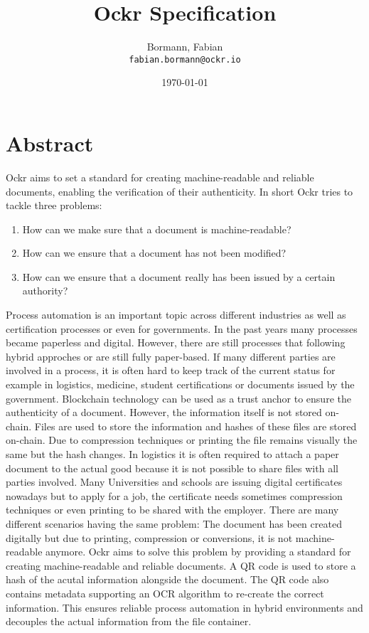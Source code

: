 \documentclass{article}
\title{Ockr Specification}
\author{
  Bormann, Fabian\\
  \texttt{fabian.bormann@ockr.io}
  \and
  \qrcode{https://github.com/ockr-io/ockr-specification/graphs/contributors}
}
\date{\today}
\begin{document}
\maketitle

\tableofcontents
\newpage

\section{Abstract}

Ockr aims to set a standard for creating machine-readable and reliable documents, 
enabling the verification of their authenticity. In short Ockr tries to tackle 
three problems:

\begin{enumerate}
    \item How can we make sure that a document is machine-readable?
    \item How can we ensure that a document has not been modified?
    \item How can we ensure that a document really has been issued by a certain authority?
\end{enumerate}

Process automation is an important topic across different industries as well as certification processes or even for governments. In the past years many processes became paperless and digital. However, there are still processes that following hybrid approches or are still fully paper-based. If many different parties are involved in a process, it is often hard to keep track of the current status for example in logistics, medicine, student certifications or documents issued by the government. Blockchain technology can be used as a trust anchor to ensure the authenticity of a document. However, the information itself is not stored on-chain. Files are used to store the information and hashes of these files are stored on-chain. Due to compression techniques or printing the file remains visually the same but the hash changes. In logistics it is often required to attach a paper document to the actual good because it is not possible to share files with all parties involved. Many Universities and schools are issuing digital certificates nowadays but to apply for a job, the certificate needs sometimes compression techniques or even printing to be shared with the employer. There are many different scenarios having the same problem: The document has been created digitally but due to printing, compression or conversions, it is not machine-readable anymore. Ockr aims to solve this problem by providing a standard for creating machine-readable and reliable documents. A QR code is used to store a hash of the acutal information alongside the document. The QR code also contains metadata supporting an OCR algorithm to re-create the correct information. This ensures reliable process automation in hybrid environments and decouples the actual information from the file container.

\newpage




\end{document}
